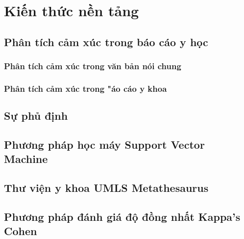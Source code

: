 \section{Kiến thức nền tảng}
\subsection{Phân tích cảm xúc trong báo cáo y học}
\subsubsection*{Phân tích cảm xúc trong văn bản nói chung}
\subsubsection*{Phân tích cảm xúc trong ^^báo cáo y khoa}
\subsection{Sự phủ định}
\subsection{Phương pháp học máy Support Vector Machine}
\subsection{Thư viện y khoa UMLS Metathesaurus}
\subsection{Phương pháp đánh giá độ đồng nhất Kappa's Cohen}